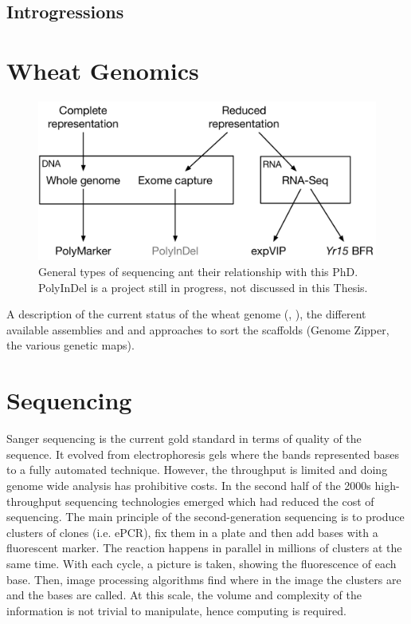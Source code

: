 \subsection{Introgressions}

\section{Wheat Genomics}

\begin{figure}
\includegraphics[width=1\textwidth]{LitReview/Figures/typesOfSequencing.pdf}
\caption{General types of sequencing ant their relationship with this PhD. PolyInDel is a project still in progress, not discussed in this Thesis. }
\end{figure}

A description of the current status of the wheat genome (\citet{Mayer2014}, \citet{Chapman2015}), the different available assemblies and and approaches to sort the scaffolds (Genome Zipper, the various genetic maps).  
\section{Sequencing} 



 Sanger sequencing \cite{Lander2001} is the current gold standard in terms of quality of the sequence. It evolved from electrophoresis gels where the bands represented bases to a fully automated technique. However, the throughput is limited and doing genome wide analysis has prohibitive costs. In the second half of the 2000s high-throughput sequencing technologies emerged which had reduced the cost of sequencing. The main principle of the second-generation sequencing is to produce clusters of clones (i.e. ePCR), fix them in a plate and then add bases with a fluorescent marker. The reaction happens in parallel in millions of clusters at the same time. With each cycle, a picture is taken, showing the fluorescence of each base. Then, image processing algorithms find where in the image the clusters are and the bases are called. At this scale, the volume and complexity of the information is not trivial to manipulate, hence computing is required. 



